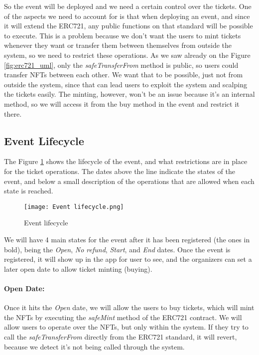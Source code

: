 So the event will be deployed and we need a certain control over the tickets.
One of the aspects we need to account for is that when deploying an event, and
since it will extend the ERC721, any public functions on that standard will be
possible to execute. This is a problem because we don't want the users to mint
tickets whenever they want or transfer them between themselves from outside the
system, so we need to restrict these operations. As we saw already on the
Figure \ref{fig:erc721_uml}, only the \textit{safeTransferFrom} method is
public, so users could transfer NFTs between each other. We want that to be
possible, just not from outside the system, since that can lead users to
exploit the system and scalping the tickets easily. The minting, however, won't
be an issue because it's an internal method, so we will access it from the buy
method in the event and restrict it there.

\subsection{Event Lifecycle}
\label{subsec:event_lifecycle}

The Figure \ref{fig:event_lifecycle} shows the lifecycle of the event, and what
restrictions are in place for the ticket operations. The dates above the line
indicate the states of the event, and below a small description of the
operations that are allowed when each state is reached.

\begin{figure}[H]
	\texttt{[image: Event lifecycle.png]}
	\centering
	\caption{Event lifecycle}
	\label{fig:event_lifecycle}
\end{figure}

We will have 4 main states for the event after it has been registered (the ones
in bold), being the \textit{Open}, \textit{No refund}, \textit{Start}, and
\textit{End} dates. Once the event is registered, it will show up in the app
for user to see, and the organizers can set a later open date to allow ticket
minting (buying).

\paragraph{Open Date:} Once it hits the \textit{Open} date, we will allow the users to buy tickets,
which will mint the NFTs by executing the \textit{safeMint} method of the
ERC721 contract. We will allow users to operate over the NFTs, but only within
the system. If they try to call the \textit{safeTransferFrom} directly from the
ERC721 standard, it will revert, because we detect it's not being called
through the system.

